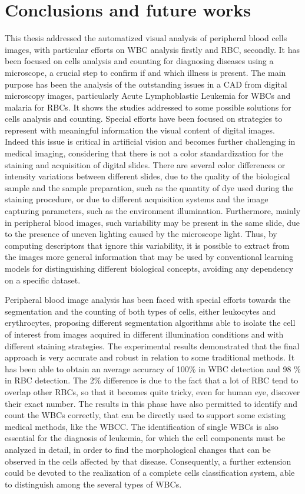 \documentclass[final,a4paper,12pt,english]{UnicaPhdThesis3}
\begin{document}
{\chapter*{Conclusions and future works} \label{tre}
This thesis addressed the automatized visual analysis of peripheral blood cells images, with particular efforts on WBC analysis firstly and RBC, secondly. It has been focused on cells analysis and counting for diagnosing diseases using a microscope, a crucial step to confirm if and which illness is present. The main purpose has been the analysis of the outstanding issues in a CAD from digital microscopy images, particularly Acute Lymphoblastic Leukemia for WBCs and malaria for RBCs. It shows the studies addressed to some possible solutions for cells analysis and counting. Special efforts have been focused on strategies to represent with meaningful information the visual content of digital images. Indeed this issue is critical in artificial vision and becomes further challenging in medical imaging, considering that there is not a color standardization for the staining and acquisition of digital slides. There are several color differences or intensity variations between different slides, due to the quality of the biological sample and the sample preparation, such as the quantity of dye used during the staining procedure, or due to different acquisition systems and the image capturing parameters, such as the environment illumination. Furthermore, mainly in peripheral blood images, such variability may be present in the same slide, due to the presence of uneven lighting caused by the microscope light. Thus, by computing descriptors that ignore this variability, it is possible to extract from the images more general information that may be used by conventional learning models for distinguishing different biological concepts, avoiding any dependency on a specific dataset. 

Peripheral blood image analysis has been faced with special efforts towards the segmentation and the counting of both types of cells, either leukocytes and erythrocytes, proposing different segmentation algorithms able to isolate the cell of interest from images acquired in different illumination conditions and with different staining strategies.
The experimental results demonstrated that the final approach is very accurate and robust in relation to some traditional methods. It has been able to obtain an average accuracy of 100\% in WBC detection and 98 \%  in RBC detection. The 2\% difference is due to the fact that a lot of RBC tend to overlap other RBCs, so that it becomes quite tricky, even for human eye, discover their exact number. The results in this phase have also permitted to identify and count the WBCs correctly, that can be directly used to support some existing medical methods, like the WBCC. 
The identification of single WBCs is also essential for the diagnosis of leukemia, for which the cell components must be analyzed in detail, in order to find the morphological changes that can be observed in the cells affected by that disease.  Consequently, a further extension could be devoted to the realization of a complete cells classification system, able to distinguish among the several types of WBCs.

}
\end{document}
